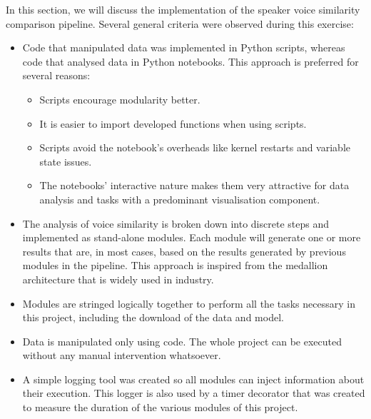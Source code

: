 \documentclass[conference]{IEEEtran}
\begin{document}
In this section, we will discuss the implementation of the speaker voice similarity comparison pipeline. Several general criteria were observed during this exercise:
\begin{itemize}
	\item Code that manipulated data was implemented in Python scripts, whereas code that analysed data in Python notebooks. This approach is preferred for several reasons:
	\begin{itemize}
		\item Scripts encourage modularity better.
		\item It is easier to import developed functions when using scripts.
		\item Scripts avoid the notebook's overheads like kernel restarts and variable state issues.
		\item The notebooks' interactive nature makes them very attractive for data analysis and tasks with a predominant visualisation component.
	\end{itemize}
	\item The analysis of voice similarity is broken down into discrete steps and implemented as stand-alone modules.    Each module will generate one or more results that are, in most cases, based on the results generated by previous modules in the pipeline. This approach is inspired from the medallion architecture that is widely used in industry.
	\item Modules are stringed logically together to perform all the tasks necessary in this project, including the download of the data and model.
	\item Data is manipulated only using code. The whole project can be executed without any manual intervention whatsoever.
	\item A simple logging tool was created so all modules can inject information about their execution. This logger is also used by a timer decorator that was created to measure the duration of the various modules of this project.
\end{itemize}
\end{document}
